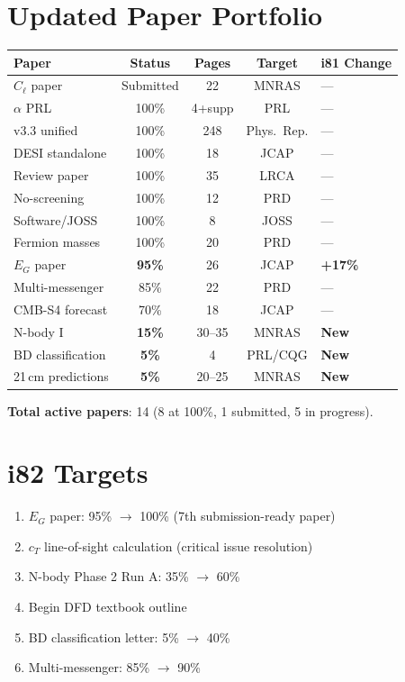 \documentclass[11pt,a4paper]{article}
\begin{document}
\section{Updated Paper Portfolio}

\begin{center}
\begin{tabular}{lcccl}
\toprule
\textbf{Paper} & \textbf{Status} & \textbf{Pages} & \textbf{Target} & \textbf{i81 Change} \\
\midrule
$C_\ell$ paper & Submitted & 22 & MNRAS & --- \\
$\alpha$ PRL & 100\% & 4+supp & PRL & --- \\
v3.3 unified & 100\% & 248 & Phys.\ Rep. & --- \\
DESI standalone & 100\% & 18 & JCAP & --- \\
Review paper & 100\% & 35 & LRCA & --- \\
No-screening & 100\% & 12 & PRD & --- \\
Software/JOSS & 100\% & 8 & JOSS & --- \\
Fermion masses & 100\% & 20 & PRD & --- \\
$E_G$ paper & \textbf{95\%} & 26 & JCAP & \textbf{+17\%} \\
Multi-messenger & 85\% & 22 & PRD & --- \\
CMB-S4 forecast & 70\% & 18 & JCAP & --- \\
N-body I & \textbf{15\%} & 30--35 & MNRAS & \textbf{New} \\
BD classification & \textbf{5\%} & 4 & PRL/CQG & \textbf{New} \\
21\,cm predictions & \textbf{5\%} & 20--25 & MNRAS & \textbf{New} \\
\bottomrule
\end{tabular}
\end{center}

\textbf{Total active papers}: 14 (8 at 100\%, 1 submitted, 5 in progress).

\section{i82 Targets}

\begin{enumerate}[nosep]
\item $E_G$ paper: 95\% $\to$ 100\% (7th submission-ready paper)
\item $c_T$ line-of-sight calculation (critical issue resolution)
\item N-body Phase 2 Run A: 35\% $\to$ 60\%
\item Begin DFD textbook outline
\item BD classification letter: 5\% $\to$ 40\%
\item Multi-messenger: 85\% $\to$ 90\%
\end{enumerate}
\end{document}
